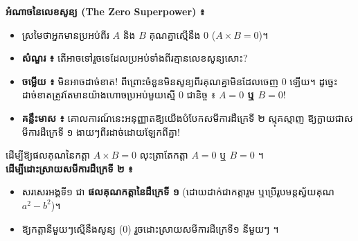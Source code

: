 \documentclass[theme=teal]{khmermath}
\newcommand{\koreahl}[1]{\colorbox{koreaYellow}{\fontsize{8.5}{8.5}\selectfont\textbf{#1}}}
\begin{document}
\begin{khboxfeynman}
  \textbf{អំណាចនៃលេខសូន្យ (The Zero Superpower) ៖}
  \begin{itemize}[leftmargin=14pt, itemsep=2pt, topsep=1pt, parsep=0pt]
    \item ស្រមៃថាអ្នកមានប្រអប់ពីរ $A$ និង $B$ គុណគ្នាស្មើនឹង $0$ ($A \times B = 0$)។
    \item \textbf{សំណួរ ៖} តើអាចទៅរួចទេដែលប្រអប់ទាំងពីរគ្មានលេខសូន្យសោះ?
    \item \textbf{ចម្លើយ ៖} មិនអាចដាច់ខាត! ពីព្រោះចំនួនមិនសូន្យពីរគុណគ្នាមិនដែលចេញ $0$ ឡើយ។ ដូច្នេះ ដាច់ខាតត្រូវតែមានយ៉ាងហោចប្រអប់មួយស្មើ $0$ ជានិច្ច ៖ \koreahl{$A = 0$ ឬ $B = 0$}!
    \item \textbf{គន្លឹះមាស ៖} គោលការណ៍នេះអនុញ្ញាតឱ្យយើងបំបែកសមីការដឺក្រេទី ២ ស្មុគស្មាញ ឱ្យក្លាយជាសមីការដឺក្រេទី ១ ងាយៗពីរដាច់ដោយឡែកពីគ្នា!
  \end{itemize}
\end{khboxfeynman}

\begin{khboxorange}[title={\fontsize{9}{9}\selectfont\kml\color{white}\ding{72}\ លក្ខណៈផលគុណនៃកត្តាស្មើនឹងសូន្យ}]
  ដើម្បីឱ្យផលគុណនៃកត្តា \koreahl{$A \times B = 0$} លុះត្រាតែកត្តា \koreahl{$A = 0$} ឬ \koreahl{$B = 0$} ។\\
  \textbf{ដើម្បីដោះស្រាយសមីការដឺក្រេទី ២ ៖}
  \begin{itemize}[leftmargin=16pt, itemsep=1.5pt, topsep=1pt, parsep=0pt]
    \item[\color{brandNavy}\ding{228}] សរសេរអង្គទី១ ជា \koreahl{ផលគុណកត្តានៃដឺក្រេទី ១} (ដោយដាក់ជាកត្តារួម ឬប្រើរូបមន្តស្វ័យគុណ $a^2-b^2$)។
    \item[\color{brandNavy}\ding{228}] ឱ្យកត្តានីមួយៗស្មើនឹងសូន្យ ($0$) រួចដោះស្រាយសមីការដឺក្រេទី១ នីមួយៗ ។
  \end{itemize}
\end{khboxorange}
\end{document}
